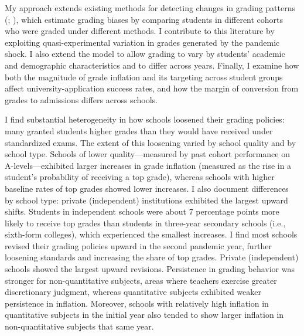 My approach extends existing methods for detecting changes in grading patterns (\cite{neal2008}; \cite{dee2019}), which estimate grading biases by comparing students in different cohorts who were graded under different methods. I contribute to this literature by exploiting quasi-experimental variation in grades generated by the pandemic shock. I also extend the model to allow grading to vary by students’ academic and demographic characteristics and to differ across years. Finally, I examine how both the magnitude of grade inflation and its targeting across student groups affect university-application success rates, and how the margin of conversion from grades to admissions differs across schools.

I find substantial heterogeneity in how schools loosened their grading policies: many granted students higher grades than they would have received under standardized exams. The extent of this loosening varied by school quality and by school type. Schools of lower quality—measured by past cohort performance on A-levels—exhibited larger increases in grade inflation (measured as the rise in a student’s probability of receiving a top grade), whereas schools with higher baseline rates of top grades showed lower increases. I also document differences by school type: private (independent) institutions exhibited the largest upward shifts. Students in independent schools were about 7 percentage points more likely to receive top grades than students in three-year secondary schools (i.e., sixth-form colleges), which experienced the smallest increases. I find most schools revised their grading policies upward in the second pandemic year, further loosening standards and increasing the share of top grades. Private (independent) schools showed the largest upward revisions. Persistence in grading behavior was stronger for non-quantitative subjects, areas where teachers exercise greater discretionary judgment, whereas quantitative subjects exhibited weaker persistence in inflation. Moreover, schools with relatively high inflation in quantitative subjects in the initial year also tended to show larger inflation in non-quantitative subjects that same year.

